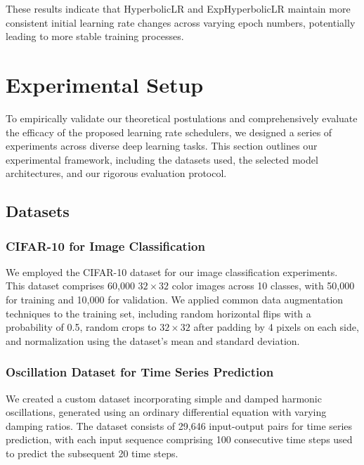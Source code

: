 \documentclass{article}
\theoremstyle{plain}
\theoremstyle{definition}
\theoremstyle{remark}
\begin{document}
These results indicate that HyperbolicLR and ExpHyperbolicLR maintain more consistent initial learning rate changes across varying epoch numbers, potentially leading to more stable training processes.

\section{Experimental Setup}
\label{sec:exp_setup}

To empirically validate our theoretical postulations and comprehensively evaluate the efficacy of the proposed learning rate schedulers, we designed a series of experiments across diverse deep learning tasks. This section outlines our experimental framework, including the datasets used, the selected model architectures, and our rigorous evaluation protocol.

\subsection{Datasets}
\label{subsec:datasets}

\subsubsection{CIFAR-10 for Image Classification}
\label{subsubsec:cifar10}

We employed the CIFAR-10 dataset \cite{krizhevsky2009learning} for our image classification experiments.
This dataset comprises 60,000 $32 \times 32$ color images across 10 classes, with 50,000 for training and 10,000 for validation.
We applied common data augmentation techniques to the training set, including random horizontal flips with a probability of 0.5, random crops to $32\times 32$ after padding by 4 pixels on each side, and normalization using the dataset's mean and standard deviation.

\subsubsection{Oscillation Dataset for Time Series Prediction}
\label{subsubsec:oscillation}

We created a custom dataset incorporating simple and damped harmonic oscillations, generated using an ordinary differential equation with varying damping ratios.
The dataset consists of 29,646 input-output pairs for time series prediction, with each input sequence comprising 100 consecutive time steps used to predict the subsequent 20 time steps.
\end{document}
